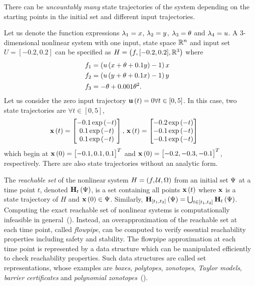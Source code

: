 There can be \emph{uncountably many} state trajectories of the system
depending on the starting points in the initial set and different
input trajectories.
%
\begin{example}\label{eg:ill}
Let us denote the function expressions $\lambda_{1} = x$, $\lambda_{2} = y$,
$\lambda_{3} = \theta$ and $\lambda_{4} = u$.  A $3$-dimensional nonlinear
system with one input, state space $\mathbb{R}^n$ and input set $U =
[-0.2,0.2]$ can be specified as $H = \left(f,[-0.2,0.2],\mathbb{R}^3\right)$ where
%
\begin{align*}
& f_1 = \left( u\left( x + \theta + 0.1y \right) - 1\right)x\\
& f_2 = \left( u\left( y + \theta + 0.1x \right) - 1\right)y\\
& f_3 = -\theta + 0.001\theta^2.
\end{align*}
%
Let us consider the zero input trajectory $\mathbf{u}\left(t\right) = 0\forall
t\in[0,5]$.  In this case, two state trajectories are $\forall
t\in[0,5]$,
%
\begin{align*}
\mathbf{x}\left(t\right) = \begin{bmatrix} -0.1\exp\left(-t\right)\\ 0.1\exp\left(-t\right)\\ 0.1\exp\left(-t\right) \end{bmatrix},~
& \mathbf{x}\left(t\right) = \begin{bmatrix} -0.2\exp\left(-t\right)\\ -0.1\exp\left(-t\right)\\ -0.1\exp\left(-t\right) \end{bmatrix}
\end{align*}
%
which begin at $\mathbf{x}\left(0\right) = \begin{bmatrix}-0.1,0.1,0.1\end{bmatrix}^T$ and $\mathbf{x}\left(0\right)
= \begin{bmatrix}-0.2,-0.3,-0.1\end{bmatrix}^T$, respectively.
%
There are also state trajectories without an analytic form.
\end{example}
%
The \emph{reachable set} of the nonlinear system $H
=\left(f,\mathcal{U},\Omega\right)$ from an initial set $\Psi$ at a time point
$t$, denoted $\mathbf{H}_{t}\left(\Psi\right)$, is a set containing all points
$\mathbf{x}\left(t\right)$ where $\mathbf{x}$ is a state trajectory of $H$ and
$\mathbf{x}\left(0\right)\in\Psi$.  Similarly, $\mathbf{H}_{[t_1,t_2]}\left(\Psi\right)
= \bigcup_{t\in[t_1,t_2]}\mathbf{H}_{t}\left(\Psi\right)$.  Computing the exact
reachable set of nonlinear systems is computationally infeasible in
general~().  Instead, an overapproximation of the reachable
set at each time point, called \emph{flowpipe}, can be computed to
verify essential reachability properties including safety and
stability.  The flowpipe approximation at each time point is
represented by a data structure which can be manipulated efficiently
to check reachability properties.  Such data structures are called set
representations, whose examples
are \emph{boxes}, \emph{polytopes}, \emph{zonotopes}, \emph{Taylor
models}, \emph{barrier certificates} and \emph{polynomial
zonotopes}~(). 

